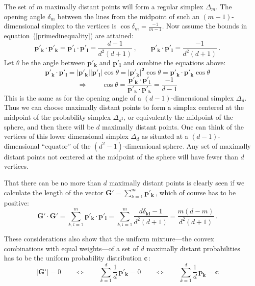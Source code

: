 \documentclass[letterpaper,11pt]{article}
\begin{document}
The set of $m$ maximally distant points will form a regular simplex $\Delta_m$. The opening angle $\delta_m$ between the lines from the midpoint of such an $(m-1)$-dimensional simplex to the vertices is $\cos\delta_m=\frac{-1}{m-1}$. Now assume the bounds in equation~(\ref{primedinequality}) are attained:
%
\begin{equation}
  \mathbf{p'_k\cdot p'_k} = \mathbf{p'_l\cdot p'_l} = \frac{d-1}{d^2(d+1)}
  \ , \qquad
  \mathbf{p'_k\cdot p'_l} = \frac{-1}{d^2(d+1)} \ .
\end{equation}
%
Let $\theta$ be the angle between $\mathbf{p'_k}$ and $\mathbf{p'_l}$ and combine the equations above:
%
\begin{equation}
  \mathbf{p'_k\cdot p'_l} = \mathbf{|p'_k| |p'_l|} \cos\theta = \mathbf{|p'_k|^2} \cos\theta =
  \mathbf{p'_k\cdot p'_k}  \cos\theta
\end{equation}
%
\begin{equation}
  \Rightarrow \qquad
   \cos\theta = \frac{\mathbf{p'_k\cdot p'_l}}{\mathbf{p'_k\cdot p'_k}} = \frac{-1}{d-1}
\end{equation}
%
This is the same as for the opening angle of a $(d-1)$-dimensional simplex $\Delta_d$. Thus we can choose maximally distant points to form a simplex centered at the midpoint of the probability simplex $\Delta_{d^2}$, or equivalently the midpoint of the sphere, and then there will be $d$ maximally distant points. One can think of the vertices of this lower dimensional simplex $\Delta_d$ as situated at a $(d-1)$-dimensional ``equator'' of the $(d^2-1)$-dimensional sphere. Any set of maximally distant points not centered at the midpoint of the sphere will have fewer than $d$ vertices.

That there can be no more than $d$ maximally distant points is clearly seen if we calculate the length of the vector $\mathbf G'=\sum_{k=1}^m \mathbf{p'_k\,}$, which of course has to be positive:
%
\begin{equation}
  \mathbf{G'\cdot G'} = \sum_{k,l=1}^m  \mathbf{p'_k\cdot p'_l} =
  \sum_{k,l=1}^m \frac{d\delta_\mathbf{kl}-1}{d^2(d+1)} = \frac{m(d-m)}{d^2(d+1)} \ .
\end{equation}
%

These considerations also show that the uniform mixture---the convex combinations with equal weights---of a set of $d$ maximally distant probabilities has to be the uniform probability distribution $\mathbf c\,$:
%
\begin{equation}
  |\mathbf G'| = 0     \qquad \Leftrightarrow \qquad
  \sum_{k=1}^d \frac{1}{d}\,\mathbf{p'_k} = 0     \qquad \Leftrightarrow \qquad
  \sum_{k=1}^d \frac{1}{d}\,\mathbf{p_k} = \mathbf c
\end{equation}
%
\end{document}
